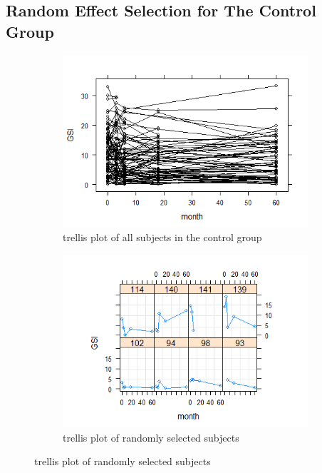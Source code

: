 \subsection{Random Effect Selection for The Control Group}\label{app:re.control}
\begin{figure}[H]
\begin{subfigure}{.33\textwidth}
  \centering
  \includegraphics[width=1\linewidth]{../../plots/trellis_control.png}
  \caption{trellis plot of all subjects in the control group}
\end{subfigure}
\begin{subfigure}{.33\textwidth}
  \centering
  \includegraphics[width=1\linewidth]{../../plots/trellis_subset_control.png}
  \caption{trellis plot of randomly selected subjects}
\end{subfigure}

\end{figure}
